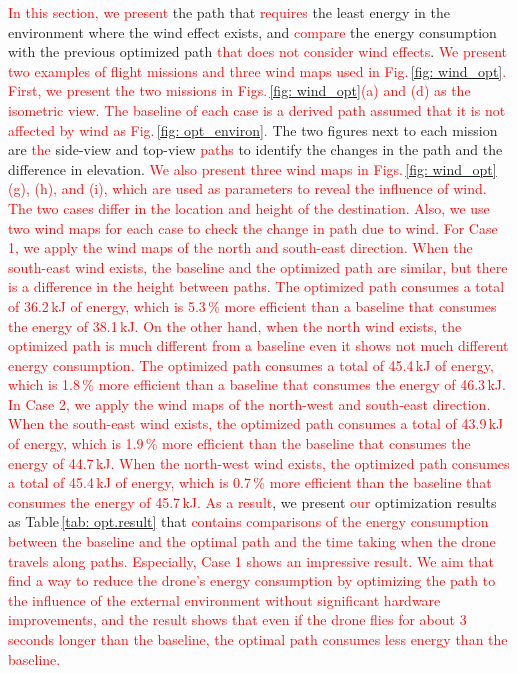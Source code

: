 \documentclass[journal]{./template/IEEEtran}
\begin{document}
\textcolor{red}{In this section, we present} the path that \textcolor{red}{requires} the least energy in the environment where the wind effect exists, and \textcolor{red}{compare} the energy consumption with the previous optimized path \textcolor{red}{that does not consider wind effects}.
\textcolor{red}{We present two examples of flight missions and three wind maps used in Fig.\,\ref{fig: wind_opt}.
First, we present the two missions in Figs.\,\ref{fig: wind_opt}(a) and (d) as the isometric view.
The baseline of each case is a derived path assumed that it is not affected by wind as Fig.\,\ref{fig: opt_environ}. %
} 
The two figures next to each mission are \textcolor{red}{the} side-view and top-view \textcolor{red}{paths} to identify the changes in the path and the difference in elevation.  
\textcolor{red}{We also present three wind maps in Figs.\,\ref{fig: wind_opt} (g), (h), and (i), which are used as parameters to reveal the influence of wind.
The two cases differ in the location and height of the destination. Also, we use two wind maps for each case to check the change in path due to wind.
For Case 1, we apply the wind maps of the north and south-east direction.
When the south-east wind exists, the baseline and the optimized path are similar, but there is a difference in the height between paths. 
The optimized path consumes a total of 36.2\,kJ of energy, which is 5.3\,\% more efficient than a baseline that consumes the energy of 38.1\,kJ.
On the other hand, when the north wind exists, the optimized path is much different from a baseline even it shows not much different energy consumption.
The optimized path consumes a total of 45.4\,kJ of energy, which is 1.8\,\% more efficient than a baseline that consumes the energy of 46.3\,kJ.
In Case 2, we apply the wind maps of the north-west and south-east direction.
When the south-east wind exists, the optimized path consumes a total of 43.9\,kJ of energy, which is 1.9\,\% more efficient than the baseline that consumes the energy of 44.7\,kJ.
When the north-west wind exists, the optimized path consumes a total of 45.4\,kJ of energy, which is 0.7\,\% more efficient than the baseline that consumes the energy of 45.7\,kJ.}
\textcolor{red}{As a result}, we present \textcolor{red}{our} optimization results as Table\,\ref{tab: opt.result} that \textcolor{red}{contains comparisons of the energy consumption between the baseline and the optimal path and the time taking when the drone travels along paths.
Especially, Case 1 shows an impressive result. 
We aim that find a way to reduce the drone's energy consumption by optimizing the path to the influence of the external environment without significant hardware improvements, and the result shows that even if the drone flies for about 3 seconds longer than the baseline, the optimal path consumes less energy than the baseline.}
\end{document}
